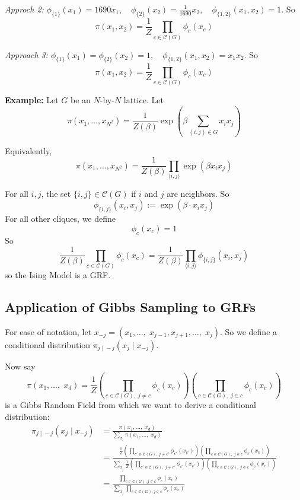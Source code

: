\documentclass[12pt]{article}
\newcommand{\brak}[1]{\langle #1 \rangle}
\newcommand{\mcC}{\mathcal{C}}
\begin{document}
        \indent \emph{Approch 2:} $\phi_{\{1\}}(x_1) = 1690x_1, \quad \phi_{\{2\}}(x_2) = \frac{1}{1690}x_2, \quad \phi_{\{1, 2\}}(x_1, x_2) = 1$. So 
        \[\pi(x_1, x_2) = \frac{1}{Z}\prod_{c \in \mathcal{C}(G)}\phi_c(x_c)\]

        \indent \emph{Approach 3:} $\phi_{\{1\}}(x_1) = \phi_{\{2\}}(x_2) = 1, \quad \phi_{\{1, 2\}}(x_1, x_2) = x_1x_2$. So
        \[\pi(x_1, x_2) = \frac{1}{Z}\prod_{c \in \mathcal{C}(G)}\phi_c(x_c)\]


        \textbf{Example:} 
        Let $G$ be an $N$-by-$N$ lattice. Let 
        \[\pi(x_1, \dots, x_{N^2}) = \frac{1}{Z(\beta)} \exp\left(\beta \sum_{(i, j) \in G} x_ix_j\right)\] 

        Equivalently, 
        \[\pi(x_1, \dots, x_{N^2}) =  \frac{1}{Z(\beta)}\prod_{\brak{i, j}} \exp(\beta x_i x_j)\]

        For all $i, j$, the set $\{i, j\} \in \mcC(G)$ if $i$ and $j$ are neighbors. So 
        \[\phi_{\{i, j\}}(x_i, x_j) := \exp(\beta \cdot x_i x_j)\]
        For all other cliques, we define 
        \[\phi_c(x_c) = 1\]
        So 
        \[\frac{1}{Z(\beta)}\prod_{c \in \mcC(G)} \phi_c(x_c) = \frac{1}{Z(\beta)}\prod_{\brak{i, j}} \phi_{\{i, j\}} (x_i, x_j)\]
       so the Ising Model is a GRF. 

    \subsection{Application of Gibbs Sampling to GRFs}
        For ease of notation, let $x_{-j} = (x_1, \dots, \; x_{j-1}, x_{j+1}, \dots, \; x_j)$. So we define a conditional distribution $\pi_{j \; | \; -j}(x_j \; | \; x_{-j})$.

        Now say
        \[\pi(x_1, \dots,\; x_d) = \frac{1}{Z}\left(\prod_{c\in \mathcal{C}(G), \; j\neq c} \phi_c(x_c)\right)\left(\prod_{c\in \mathcal{C}(G), \; j \in c} \phi_c(x_c)\right)\]
        is a Gibbs Random Field from which we want to derive a conditional distribution: 
        \begin{align*}
            \pi_{j \; | \; -j}(x_j \; | \; x_{-j}) &= \frac{\pi(x_1, \dots,\; x_d)}{\sum_{x_i} \pi(x_1, \dots,\; x_d)}\\
            &= \frac{\frac{1}{Z}\left(\prod_{c'\in \mathcal{C}(G), \; j\neq c'} \phi_{c'}(x_{c'})\right)\left(\prod_{c\in \mathcal{C}(G), \; j \in c} \phi_c(x_c)\right)}{\sum_{x_j}\frac{1}{Z}\left(\prod_{c'\in \mathcal{C}(G), \; j\neq c'} \phi_{c'}(x_{c'})\right)\left(\prod_{c\in \mathcal{C}(G), \; j \in c} \phi_c(x_c)\right)}\\
            &= \frac{\prod_{c\in \mathcal{C}(G), j \in c} \phi_c(x_c)}{\sum_{x_j}\prod_{c\in \mathcal{C}(G), j \in c} \phi_c(x_c)}
        \end{align*}
\end{document}
